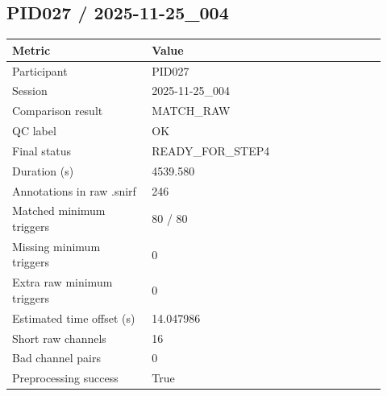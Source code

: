 \subsection*{PID027 / 2025-11-25\_004}
\begin{tabular}{p{0.34\linewidth}p{0.58\linewidth}}
\toprule
Metric & Value\\
\midrule
Participant & PID027\\
Session & 2025-11-25\_004\\
Comparison result & MATCH\_RAW\\
QC label & OK\\
Final status & READY\_FOR\_STEP4\\
Duration (s) & 4539.580\\
Annotations in raw .snirf & 246\\
Matched minimum triggers & 80 / 80\\
Missing minimum triggers & 0\\
Extra raw minimum triggers & 0\\
Estimated time offset (s) & 14.047986\\
Short raw channels & 16\\
Bad channel pairs & 0\\
Preprocessing success & True\\
\bottomrule
\end{tabular}
